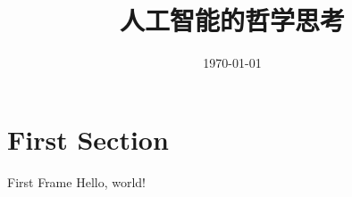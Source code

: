 \documentclass{beamer}
\title{人工智能的哲学思考}
\date{\today}
\author{}
\institute{Centre for Modern Beamer Themes}
\begin{document}
  \maketitle
  \section{First Section}
  \begin{frame}{First Frame}
    Hello, world!
  \end{frame}
\end{document}
